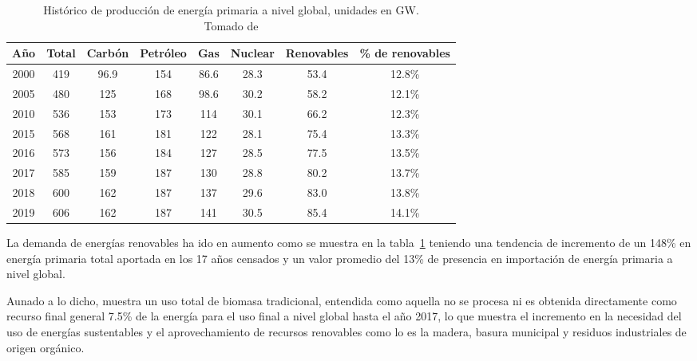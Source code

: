\begin{table}[H]
    \centering
    \caption{Histórico de producción  de energía primaria a nivel global, unidades en GW. \\ Tomado de \textcite{wba2021}} 
    \label{tab:biomasa22} 
    \begin{tabular}{cccccccc}
    \hline
    Año  & Total & Carbón & Petróleo & Gas  & Nuclear & Renovables & \% de renovables \\
    \hline
    2000 & 419   & 96.9   & 154      & 86.6 & 28.3    & 53.4       & 12.8\%           \\
    2005 & 480   & 125    & 168      & 98.6 & 30.2    & 58.2       & 12.1\%           \\
    2010 & 536   & 153    & 173      & 114  & 30.1    & 66.2       & 12.3\%           \\
    2015 & 568   & 161    & 181      & 122  & 28.1    & 75.4       & 13.3\%           \\
    2016 & 573   & 156    & 184      & 127  & 28.5    & 77.5       & 13.5\%           \\
    2017 & 585   & 159    & 187      & 130  & 28.8    & 80.2       & 13.7\%           \\
    2018 & 600   & 162    & 187      & 137  & 29.6    & 83.0       & 13.8\%           \\
    2019 & 606   & 162    & 187      & 141  & 30.5    & 85.4       & 14.1\%           \\
    \hline
    \end{tabular}
\end{table}


La demanda de energías renovables ha ido en aumento como se muestra en la tabla~\ref{tab:biomasa22} teniendo una tendencia de incremento de un 148\% en energía primaria total aportada en los 17 años censados y un valor promedio del 13\% de presencia en importación de energía primaria a nivel global.

Aunado a lo dicho, \textcite{ren212022global} muestra un uso total de biomasa tradicional, entendida como aquella no se procesa ni es obtenida directamente como recurso final general 7.5\% de la energía para el uso final a nivel global hasta el año 2017, lo que muestra el incremento en la necesidad del uso de energías sustentables y el aprovechamiento de recursos renovables como lo es la madera, basura municipal y residuos industriales de origen orgánico. 

